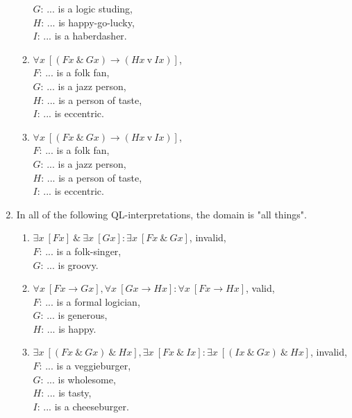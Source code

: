 \documentclass[a4paper,12pt]{article}
\newcommand{\ra}{\rightarrow}
\newcommand{\tv}{ \ \textrm{v} \ }
\newcommand{\ta}{ \ \& \ }
\newcommand{\all}{\forall}
\newcommand{\ex}{\exists}
\begin{document}
\begin{enumerate}[label=\arabic*,leftmargin=*]
\begin{enumerate}[label=(\roman*),leftmargin=*]
                    $G$: ... is a logic studing,\\
                    $H$: ... is happy-go-lucky,\\
                    $I$: ... is a haberdasher.
                \item $\all x \ [(Fx \ta Gx) \ra (Hx \tv Ix)]$,\\
                    $F$: ... is a folk fan,\\
                    $G$: ... is a jazz person,\\
                    $H$: ... is a person of taste,\\
                    $I$: ... is eccentric.
                \item $\all x \ [(Fx \ta Gx) \ra (Hx \tv Ix)]$,\\
                    $F$: ... is a folk fan,\\
                    $G$: ... is a jazz person,\\
                    $H$: ... is a person of taste,\\
                    $I$: ... is eccentric.
            \end{enumerate}
        \newpage
        \item In all of the following QL-interpretations, the domain is "all things".
            \begin{enumerate}[label=(\roman*),leftmargin=*]
                \item $\ex x \ [Fx] \ta \ex x \ [Gx] : \ex x \ [Fx \ta Gx]$, invalid,\\
                    $F$: ... is a folk-singer,\\
                    $G$: ... is groovy.
                \item $\all x \ [Fx \ra Gx], \all x \ [Gx \ra Hx] : \all x \ [Fx \ra Hx]$, valid,\\
                    $F$: ... is a formal logician,\\
                    $G$: ... is generous,\\
                    $H$: ... is happy.
                \item $\ex x \ [(Fx \ta Gx) \ta Hx], \ex x \ [Fx \ta Ix] : \ex x \ [(Ix \ta Gx) \ta Hx]$, invalid,\\
                    $F$: ... is a veggieburger,\\
                    $G$: ... is wholesome,\\
                    $H$: ... is tasty,\\
                    $I$: ... is a cheeseburger.

\end{enumerate}
\end{enumerate}
\end{document}
